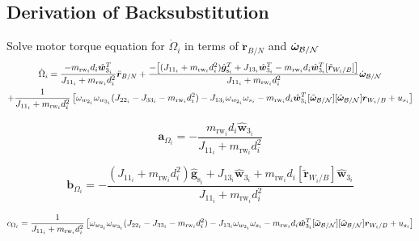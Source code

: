 \documentclass[]{BasiliskReportMemo}
\begin{document}
\subsection{Derivation of Backsubstitution}

Solve motor torque equation for $\dot{\Omega}_i$ in terms of $\ddot{\bm{r}}_{B/N}$ and $\dot{\bm\omega}_{\cal B/N}$
\begin{multline}
\dot{\Omega}_i
= \frac{-m_{\text{rw}_i} d_i \hat{\bm{w}}_{3_i}^T }{J_{11_i} + m_{\text{rw}_i} d_i^2}\ddot{\bm{r}}_{B/N} + \frac{-\big[(J_{11_i} + m_{\text{rw}_i} d_i^2)\hat{\bm g}_{\text{s}_i}^T  + J_{13_i}\hat{\bm w}_{3_i}^T -m_{\text{rw}_i} d_i \hat{\bm{w}}_{3_i}^T [\tilde{\bm r}_{W_i/B}]\big]}{J_{11_i} + m_{\text{rw}_i} d_i^2}\dot{\bm\omega}_{\cal B/N}
\\
+\frac{1}{J_{11_i} + m_{\text{rw}_i} d_i^2}\left[\omega_{w_{2_i}} \omega_{w_{3_i}} (J_{22_i} - J_{33_i} - m_{\text{rw}_i} d_i^2
)-J_{13_i} \omega_{w_{2_i}}\omega_{s_i} -m_{\text{rw}_i} d_i \hat{\bm{w}}_{3_i}^T [\tilde{\bm\omega}_{\cal B/N}] [\tilde{\bm\omega}_{\cal B/N}] \bm r_{W_i/B} + u_{s_i} \right]
\label{eq:motorTorqueFinal2}
\end{multline}

\begin{equation}
\bm{a}_{\Omega_i} = -\frac{m_{\text{rw}_i} d_i \hat{\bm{w}}_{3_i} }{J_{11_i} + m_{\text{rw}_i} d_i^2}
\end{equation}

\begin{equation}
\bm{b}_{\Omega_i} = -\frac{(J_{11_i} + m_{\text{rw}_i} d_i^2)\hat{\bm g}_{\text{s}_i}  + J_{13_i}\hat{\bm w}_{3_i} +m_{\text{rw}_i} d_i  [\tilde{\bm r}_{W_i/B}]\hat{\bm{w}}_{3_i}}{J_{11_i} + m_{\text{rw}_i} d_i^2}
\end{equation}

\begin{equation}
c_{\Omega_i} = \frac{1}{J_{11_i} + m_{\text{rw}_i} d_i^2}\left[\omega_{w_{2_i}} \omega_{w_{3_i}} (J_{22_i} - J_{33_i} - m_{\text{rw}_i} d_i^2
) - J_{13_i} \omega_{w_{2_i}}\omega_{s_i} -m_{\text{rw}_i} d_i \hat{\bm{w}}_{3_i}^T [\tilde{\bm\omega}_{\cal B/N}] [\tilde{\bm\omega}_{\cal B/N}] \bm r_{W_i/B} + u_{s_i} \right]
\end{equation}
\end{document}
